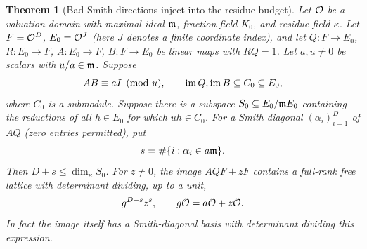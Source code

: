 \documentclass[11pt]{article}
\newtheorem{theorem}{Theorem}[section]
\theoremstyle{remark}\newtheorem{remark}[theorem]{Remark}
\begin{document}
\begin{theorem}[Bad Smith directions inject into the residue budget]\label{thm:smith}
Let $\mathcal O$ be a valuation domain with maximal ideal $\mathfrak m$, fraction field $K_0$, and residue field $\kappa$. Let $F=\mathcal O^D$, $E_0=\mathcal O^J$ (here $J$ denotes a finite coordinate index), and let $Q:F\to E_0$, $R:E_0\to F$, $A:E_0\to F$, $B:F\to E_0$ be linear maps with $RQ=1$. Let $a,u\ne0$ be scalars with $u/a\in\mathfrak m$. Suppose
\begin{equation}\label{eq:near}
 AB\equiv a I\pmod{u},\qquad \operatorname{im} Q,\operatorname{im} B\subseteq C_0\subseteq E_0,
\end{equation}
where $C_0$ is a submodule. Suppose there is a subspace $S_0\subseteq E_0/\mathfrak m E_0$ containing the reductions of all $h\in E_0$ for which $uh\in C_0$. For a Smith diagonal $(\alpha_i)_{i=1}^D$ of $AQ$ (zero entries permitted), put
\[
 s=\#\{i:\alpha_i\in a\mathfrak m\}.
\]
Then $D+s\leq\dim_\kappa S_0$. For $z\ne0$, the image $AQF+zF$ contains a full-rank free lattice with determinant dividing, up to a unit,
\begin{equation}\label{eq:boundsmith}
 g^{D-s}z^{s},\qquad g\mathcal O=a\mathcal O+z\mathcal O.
\end{equation}
In fact the image itself has a Smith-diagonal basis with determinant dividing this expression.
\end{theorem}
\end{document}
